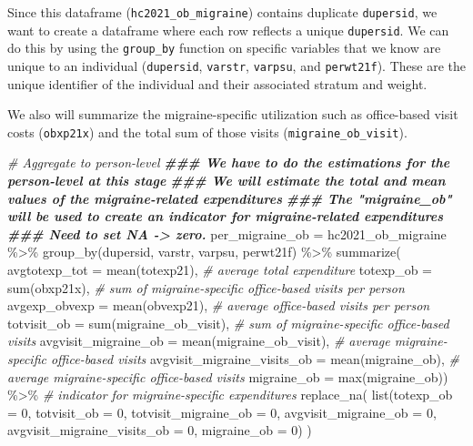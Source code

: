 \documentclass[
]{book}
\newenvironment{Shaded}{\begin{snugshade}}{\end{snugshade}}
\newcommand{\AttributeTok}[1]{\textcolor[rgb]{0.77,0.63,0.00}{#1}}
\newcommand{\CommentTok}[1]{\textcolor[rgb]{0.56,0.35,0.01}{\textit{#1}}}
\newcommand{\DecValTok}[1]{\textcolor[rgb]{0.00,0.00,0.81}{#1}}
\newcommand{\DocumentationTok}[1]{\textcolor[rgb]{0.56,0.35,0.01}{\textbf{\textit{#1}}}}
\newcommand{\FunctionTok}[1]{\textcolor[rgb]{0.00,0.00,0.00}{#1}}
\newcommand{\NormalTok}[1]{#1}
\newcommand{\OtherTok}[1]{\textcolor[rgb]{0.56,0.35,0.01}{#1}}
\newcommand{\SpecialCharTok}[1]{\textcolor[rgb]{0.00,0.00,0.00}{#1}}
\begin{document}
Since this dataframe (\texttt{hc2021\_ob\_migraine}) contains duplicate \texttt{dupersid}, we want to create a dataframe where each row reflects a unique \texttt{dupersid}. We can do this by using the \texttt{group\_by} function on specific variables that we know are unique to an individual (\texttt{dupersid}, \texttt{varstr}, \texttt{varpsu}, and \texttt{perwt21f}). These are the unique identifier of the individual and their associated stratum and weight.

We also will summarize the migraine-specific utilization such as office-based visit costs (\texttt{obxp21x}) and the total sum of those visits (\texttt{migraine\_ob\_visit}).

\begin{Shaded}
\begin{Highlighting}[]
\CommentTok{\# Aggregate to person{-}level}
\DocumentationTok{\#\#\# We have to do the estimations for the person{-}level at this stage}
\DocumentationTok{\#\#\# We will estimate the total and mean values of the migraine{-}related expenditures}
\DocumentationTok{\#\#\# The "migraine\_ob" will be used to create an indicator for migraine{-}related expenditures}
\DocumentationTok{\#\#\# Need to set NA {-}\textgreater{} zero.}
\NormalTok{per\_migraine\_ob }\OtherTok{=}\NormalTok{ hc2021\_ob\_migraine }\SpecialCharTok{\%\textgreater{}\%}
  \FunctionTok{group\_by}\NormalTok{(dupersid, varstr, varpsu, perwt21f) }\SpecialCharTok{\%\textgreater{}\%}
  \FunctionTok{summarize}\NormalTok{(}
    \AttributeTok{avgtotexp\_tot               =} \FunctionTok{mean}\NormalTok{(totexp21),  }\CommentTok{\# average total expenditure}
    \AttributeTok{totexp\_ob                   =} \FunctionTok{sum}\NormalTok{(obxp21x),    }\CommentTok{\# sum of migraine{-}specific office{-}based visits per person}
    \AttributeTok{avgexp\_obvexp               =} \FunctionTok{mean}\NormalTok{(obvexp21),  }\CommentTok{\# average office{-}based visits per person}
    \AttributeTok{totvisit\_ob                 =} \FunctionTok{sum}\NormalTok{(migraine\_ob\_visit), }\CommentTok{\# sum of migraine{-}specific office{-}based visits}
    \AttributeTok{avgvisit\_migraine\_ob        =} \FunctionTok{mean}\NormalTok{(migraine\_ob\_visit), }\CommentTok{\# average migraine{-}specific office{-}based visits}
    \AttributeTok{avgvisit\_migraine\_visits\_ob =} \FunctionTok{mean}\NormalTok{(migraine\_ob), }\CommentTok{\# average migraine{-}specific office{-}based visits}
    \AttributeTok{migraine\_ob                 =} \FunctionTok{max}\NormalTok{(migraine\_ob)) }\SpecialCharTok{\%\textgreater{}\%} \CommentTok{\# indicator for migraine{-}specific expenditures}
    \FunctionTok{replace\_na}\NormalTok{(}
      \FunctionTok{list}\NormalTok{(}\AttributeTok{totexp\_ob =} \DecValTok{0}\NormalTok{, }\AttributeTok{totvisit\_ob =} \DecValTok{0}\NormalTok{, }\AttributeTok{totvisit\_migraine\_ob =} \DecValTok{0}\NormalTok{, }\AttributeTok{avgvisit\_migraine\_ob =} \DecValTok{0}\NormalTok{, }\AttributeTok{avgvisit\_migraine\_visits\_ob =} \DecValTok{0}\NormalTok{, }\AttributeTok{migraine\_ob =} \DecValTok{0}\NormalTok{)}
\NormalTok{    )}
\end{Highlighting}
\end{Shaded}
\end{document}

